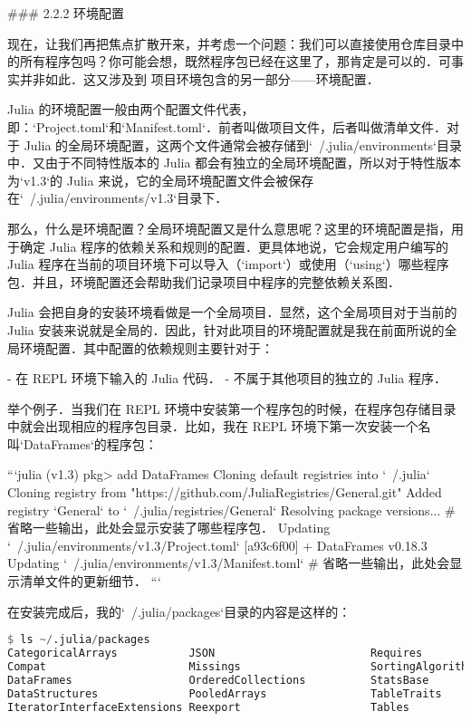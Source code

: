 ### 2.2.2 环境配置

现在，让我们再把焦点扩散开来，并考虑一个问题：我们可以直接使用仓库目录中的所有程序包吗？你可能会想，既然程序包已经在这里了，那肯定是可以的．可事实并非如此．这又涉及到 项目环境包含的另一部分——环境配置．

Julia 的环境配置一般由两个配置文件代表，即：`Project.toml`和`Manifest.toml`．前者叫做项目文件，后者叫做清单文件．对于 Julia 的全局环境配置，这两个文件通常会被存储到`~/.julia/environments`目录中．又由于不同特性版本的 Julia 都会有独立的全局环境配置，所以对于特性版本为`v1.3`的 Julia 来说，它的全局环境配置文件会被保存在`~/.julia/environments/v1.3`目录下．

那么，什么是环境配置？全局环境配置又是什么意思呢？这里的环境配置是指，用于确定 Julia 程序的依赖关系和规则的配置．更具体地说，它会规定用户编写的 Julia 程序在当前的项目环境下可以导入（`import`）或使用（`using`）哪些程序包．并且，环境配置还会帮助我们记录项目中程序的完整依赖关系图．

Julia 会把自身的安装环境看做是一个全局项目．显然，这个全局项目对于当前的 Julia 安装来说就是全局的．因此，针对此项目的环境配置就是我在前面所说的全局环境配置．其中配置的依赖规则主要针对于：

- 在 REPL 环境下输入的 Julia 代码．
- 不属于其他项目的独立的 Julia 程序．

举个例子．当我们在 REPL 环境中安装第一个程序包的时候，在程序包存储目录中就会出现相应的程序包目录．比如，我在 REPL 环境下第一次安装一个名叫`DataFrames`的程序包：

```julia
(v1.3) pkg> add DataFrames
   Cloning default registries into `~/.julia`
   Cloning registry from "https://github.com/JuliaRegistries/General.git"
     Added registry `General` to `~/.julia/registries/General`
 Resolving package versions...
 # 省略一些输出，此处会显示安装了哪些程序包．
  Updating `~/.julia/environments/v1.3/Project.toml`
  [a93c6f00] + DataFrames v0.18.3
  Updating `~/.julia/environments/v1.3/Manifest.toml`
  # 省略一些输出，此处会显示清单文件的更新细节．
```

在安装完成后，我的`~/.julia/packages`目录的内容是这样的：

\begin{lstlisting}[language=julia]
$ ls ~/.julia/packages
CategoricalArrays           JSON                        Requires
Compat                      Missings                    SortingAlgorithms
DataFrames                  OrderedCollections          StatsBase
DataStructures              PooledArrays                TableTraits
IteratorInterfaceExtensions Reexport                    Tables
\end{lstlisting}

